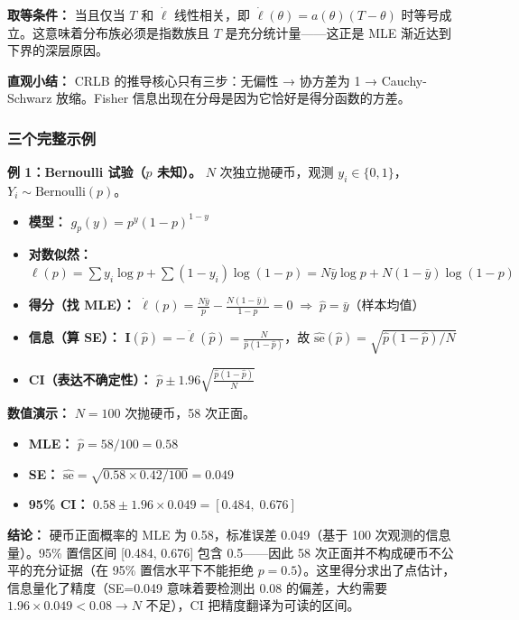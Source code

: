 \textbf{取等条件：} 当且仅当 $T$ 和 $\dot{\ell}$ 线性相关，即 $\dot{\ell}(\theta) = a(\theta)(T - \theta)$ 时等号成立。这意味着分布族必须是指数族且 $T$ 是充分统计量——这正是 MLE 渐近达到下界的深层原因。

\textbf{直观小结：} CRLB 的推导核心只有三步：无偏性 → 协方差为 1 → Cauchy-Schwarz 放缩。Fisher 信息出现在分母是因为它恰好是得分函数的方差。

\subsubsection{三个完整示例}

\textbf{例 1：Bernoulli 试验（$p$ 未知）。}
$N$ 次独立抛硬币，观测 $y_i \in \{0,1\}$，$Y_i \sim \mathrm{Bernoulli}(p)$。

\begin{itemize}
    \item \textbf{模型：} $g_p(y) = p^y(1-p)^{1-y}$
    \item \textbf{对数似然：} $\ell(p) = \sum y_i \log p + \sum(1-y_i)\log(1-p) = N\bar{y}\log p + N(1-\bar{y})\log(1-p)$
    \item \textbf{得分（找 MLE）：} $\dot{\ell}(p) = \frac{N\bar{y}}{p} - \frac{N(1-\bar{y})}{1-p} = 0 \;\Rightarrow\; \hat{p} = \bar{y}$（样本均值）
    \item \textbf{信息（算 SE）：} $\mathbf{I}(\hat{p}) = -\ddot{\ell}(\hat{p}) = \frac{N}{\hat{p}(1-\hat{p})}$，故 $\widehat{\mathrm{se}}(\hat{p}) = \sqrt{\hat{p}(1-\hat{p})/N}$
    \item \textbf{CI（表达不确定性）：} $\hat{p} \pm 1.96\sqrt{\frac{\hat{p}(1-\hat{p})}{N}}$
\end{itemize}

\textbf{数值演示：} $N=100$ 次抛硬币，58 次正面。

\begin{itemize}
    \item \textbf{MLE：} $\hat{p} = 58/100 = 0.58$
    \item \textbf{SE：} $\widehat{\mathrm{se}} = \sqrt{0.58\times0.42/100} = 0.049$
    \item \textbf{95\% CI：} $0.58 \pm 1.96\times 0.049 = [0.484,\; 0.676]$
\end{itemize}

\textbf{结论：} 硬币正面概率的 MLE 为 0.58，标准误差 0.049（基于 100 次观测的信息量）。95\% 置信区间 [0.484, 0.676] 包含 0.5——因此 58 次正面并不构成硬币不公平的充分证据（在 95\% 置信水平下不能拒绝 $p=0.5$）。这里得分求出了点估计，信息量化了精度（SE=0.049 意味着要检测出 0.08 的偏差，大约需要 $1.96\times0.049<0.08\to N$ 不足），CI 把精度翻译为可读的区间。

